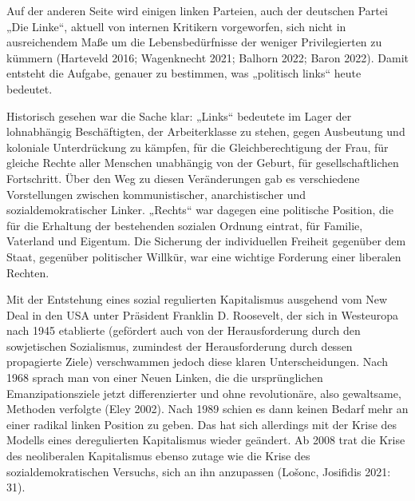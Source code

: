 \begin{multicols*}{2}
    Auf der anderen Seite wird einigen linken Parteien, auch der deutschen Partei „Die Linke“, aktuell von internen Kritikern vorgeworfen, sich nicht in ausreichendem Maße um die Lebensbedürfnisse der weniger Privilegierten zu kümmern (Harteveld 2016; Wagenknecht 2021; Balhorn 2022; Baron 2022). Damit entsteht die Aufgabe, genauer zu bestimmen, was „politisch links“ heute bedeutet.  

    Historisch gesehen war die Sache klar: „Links“ bedeutete im Lager der lohnabhängig Beschäftigten, der Arbeiterklasse zu stehen, gegen Ausbeutung und koloniale Unterdrückung zu kämpfen, für die Gleichberechtigung der Frau, für gleiche Rechte aller Menschen unabhängig von der Geburt, für gesellschaftlichen Fortschritt. Über den Weg zu diesen Veränderungen gab es verschiedene Vorstellungen zwischen kommunistischer, anarchistischer und sozialdemokratischer Linker. „Rechts“ war dagegen eine politische Position, die für die Erhaltung der bestehenden sozialen Ordnung eintrat, für Familie, Vaterland und Eigentum. Die Sicherung der individuellen Freiheit gegenüber dem Staat, gegenüber politischer Willkür, war eine wichtige Forderung einer liberalen Rechten.

    Mit der Entstehung eines sozial regulierten Kapitalismus ausgehend vom New Deal in den USA unter Präsident Franklin D. Roosevelt, der sich in Westeuropa nach 1945 etablierte (gefördert auch von der Herausforderung durch den sowjetischen Sozialismus, zumindest der Herausforderung durch dessen propagierte Ziele) verschwammen jedoch diese klaren Unterscheidungen. Nach 1968 sprach man von einer Neuen Linken, die die ursprünglichen Emanzipationsziele jetzt differenzierter und ohne revolutionäre, also gewaltsame, Methoden verfolgte (Eley 2002). Nach 1989 schien es dann keinen Bedarf mehr an einer radikal linken Position zu geben. Das hat sich allerdings mit der Krise des Modells eines deregulierten Kapitalismus wieder geändert. Ab 2008 trat die Krise des neoliberalen Kapitalismus ebenso zutage wie die Krise des sozialdemokratischen Versuchs, sich an ihn anzupassen (Lošonc, Josifidis 2021: 31).


\end{multicols*}
